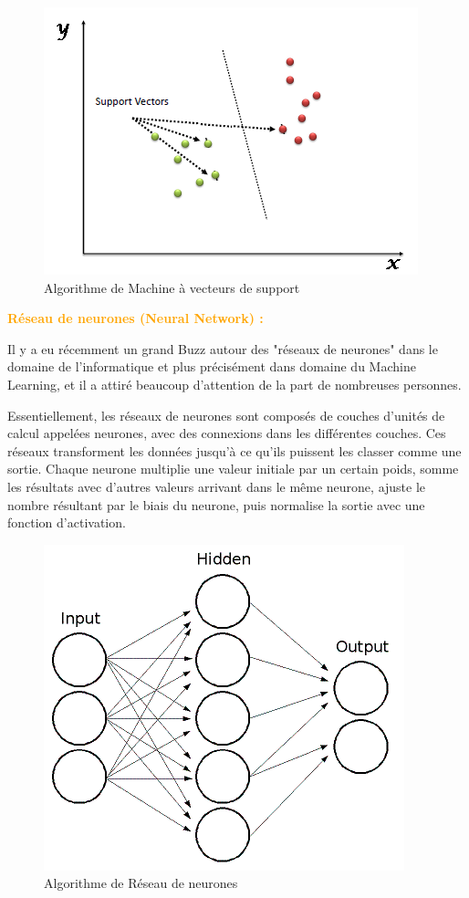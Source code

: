 \begin{figure}[H]
\begin{center}
\includegraphics[width=0.8\linewidth]{images/SVM.png}
\end{center}
\caption{Algorithme de Machine à vecteurs de support}
\label{fig:10}
\end{figure}



\textcolor{Orange}{\textbf{Réseau de neurones (Neural Network) : }}

Il y a eu récemment un grand Buzz autour des "réseaux de neurones" dans le domaine de l'informatique et plus précisément dans domaine du Machine Learning, et il a attiré beaucoup d'attention de la part de nombreuses personnes.

Essentiellement, les réseaux de neurones sont composés de couches d'unités de calcul appelées neurones, avec des connexions dans les différentes couches. Ces réseaux transforment les données jusqu'à ce qu'ils puissent les classer comme une sortie. Chaque neurone multiplie une valeur initiale par un certain poids, somme les résultats avec d'autres valeurs arrivant dans le même neurone, ajuste le nombre résultant par le biais du neurone, puis normalise la sortie avec une fonction d'activation.

\begin{figure}[H]
\begin{center}
\includegraphics[width=0.7\linewidth]{images/RN.png}
\end{center}
\caption{Algorithme de Réseau de neurones}
\label{fig:11}
\end{figure}


